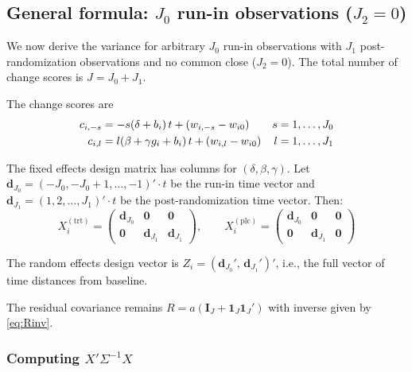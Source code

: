 \documentclass[
  11pt,
]{article}
\begin{document}
\subsection{\texorpdfstring{General formula: \(J_0\) run-in observations (\(J_2=0\))}{General formula: J\_0 run-in observations (J\_2=0)}}\label{general-formula-j_0-run-in-observations-j_20}

We now derive the variance for arbitrary \(J_0\) run-in
observations with \(J_1\) post-randomization observations and
no common close (\(J_2 = 0\)). The total number of change scores
is \(J = J_0 + J_1\).

The change scores are
\begin{align}
  c_{i,-s} &= -s(\delta + b_i)\,t + (w_{i,-s} - w_{i0})
    & s &= 1,\ldots,J_0 \notag \\
  c_{i,l}  &= l(\beta + \gamma g_i + b_i)\,t
    + (w_{i,l} - w_{i0})
    & l &= 1,\ldots,J_1
\end{align}

The fixed effects design matrix has columns for
\((\delta, \beta, \gamma)\). Let \(\mathbf{d}_{J_0} = (-J_0, -J_0+1,
\ldots, -1)' \cdot t\) be the run-in time vector and
\(\mathbf{d}_{J_1} = (1, 2, \ldots, J_1)' \cdot t\) be the
post-randomization time vector. Then:
\[
  X_i^{(\text{trt})} = \begin{pmatrix}
    \mathbf{d}_{J_0} & \mathbf{0} & \mathbf{0} \\
    \mathbf{0}   & \mathbf{d}_{J_1} & \mathbf{d}_{J_1}
  \end{pmatrix}, \qquad
  X_i^{(\text{plc})} = \begin{pmatrix}
    \mathbf{d}_{J_0} & \mathbf{0} & \mathbf{0} \\
    \mathbf{0}   & \mathbf{d}_{J_1} & \mathbf{0}
  \end{pmatrix}
\]

The random effects design vector is
\(Z_i = (\mathbf{d}_{J_0}',\, \mathbf{d}_{J_1}')'\), i.e., the full
vector of time distances from baseline.

The residual covariance remains \(R = a(\mathbf{I}_J +
\mathbf{1}_J\mathbf{1}_J')\) with inverse given by
\eqref{eq:Rinv}.

\subsubsection{\texorpdfstring{Computing \(X'\Sigma^{-1}X\)}{Computing X\textquotesingle\textbackslash Sigma\^{}\{-1\}X}}\label{computing-xsigma-1x}
\end{document}
